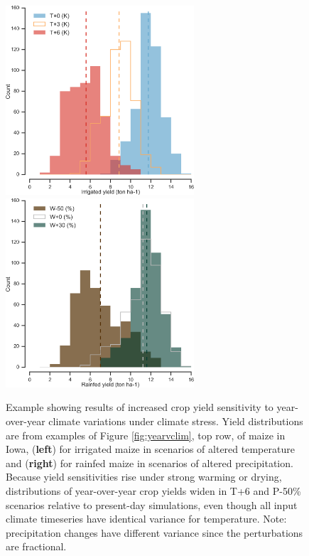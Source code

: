 \documentclass[gmd, manuscript]{copernicus} %
\begin{document}
\begin{figure}[ht]
\centering
   \includegraphics[width=7cm]{figures/hist_year_t.png} \hspace{10mm} \includegraphics[width=7cm]{figures/hist_year_pr.png}
   \caption{
   Example showing results of increased crop yield sensitivity to year-over-year climate variations under climate stress. 
	Yield distributions are from examples of Figure \ref{fig:yearvclim}, top row, of maize in Iowa, (\textbf{left}) for irrigated maize in scenarios of altered temperature and (\textbf{right}) for rainfed maize in scenarios of altered precipitation.
	Because yield sensitivities rise under strong warming or drying, distributions of year-over-year crop yields widen in T+6  and P-50\% scenarios relative to present-day simulations, even though all input climate timeseries have identical variance for temperature. Note: precipitation changes have different variance since the perturbations are fractional.  
    }
   \label{fig:yearly}
\end{figure}
\end{document}
